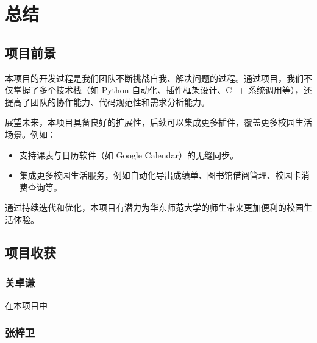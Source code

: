 \documentclass[14pt,a4paper,UTF8,twoside]{article}
\begin{document}
    \section{总结}

    \subsection{项目前景}

    本项目的开发过程是我们团队不断挑战自我、解决问题的过程。通过项目，我们不仅掌握了多个技术栈（如 Python 自动化、插件框架设计、C++ 系统调用等），还提高了团队的协作能力、代码规范性和需求分析能力。

    展望未来，本项目具备良好的扩展性，后续可以集成更多插件，覆盖更多校园生活场景。例如：
    \begin{itemize}
        \item 支持课表与日历软件（如 Google Calendar）的无缝同步。
        \item 集成更多校园生活服务，例如自动化导出成绩单、图书馆借阅管理、校园卡消费查询等。
    \end{itemize}

    通过持续迭代和优化，本项目有潜力为华东师范大学的师生带来更加便利的校园生活体验。

    \subsection{项目收获}

    \subsubsection*{关卓谦}

    \begin{Thought}
        在本项目中
    \end{Thought}

    \subsubsection*{张梓卫}
\end{document}
